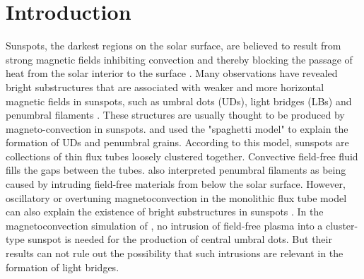 \documentclass[preprint2]{aastex}
\begin{document}



\section{Introduction}
Sunspots, the darkest regions on the solar surface, are believed to result from strong magnetic fields inhibiting convection and thereby blocking the passage of heat from the solar interior to the surface \citep[e.g,][]{Solanki2003}. Many observations have revealed bright substructures that are associated with weaker and more horizontal magnetic fields in sunspots, such as umbral dots (UDs), light bridges (LBs) and penumbral filaments \citep[e.g.,][]
{LoughheadandBray1960,Danielson1964,BrayandLoughhead1964,BeckersandSchroter1968,BeckersandSchroter1969b,Lites1990,Leka1997,Socas2004,Jurcak2006,Riethmuller2013,Tiwari2013,Lagg2014,Felipe2017,Wang2018}. These structures are usually thought to be produced by magneto-convection in sunspots. \cite{Parker1979c} and \cite{Choudhuri1986} used the "spaghetti model" to explain the formation of UDs and penumbral grains. According to this model,  sunspots are collections of thin flux tubes loosely clustered together. Convective field-free fluid fills the gaps between the tubes. \cite{SpruitandSchramer} also interpreted penumbral filaments as being caused by intruding field-free materials from below the solar surface. However, oscillatory or overtuning magnetoconvection in the monolithic flux tube model can also explain the existence of bright substructures in sunspots \citep[e.g.,][]{KnoblochandWeiss1984,Weiss1990,Weiss1996,Rimmele1997,Rempel2009a,Rempel2009b}. In the magnetoconvection simulation of \cite{SchusslerandVolger}, no intrusion of field-free plasma into a cluster-type sunspot is needed for the production of central umbral dots. But their results can not rule out the possibility that such intrusions are relevant in the formation of light bridges.
\end{document}
